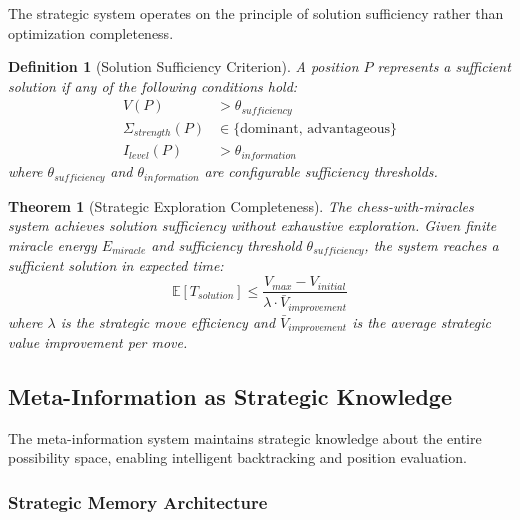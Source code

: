 \documentclass[12pt,a4paper]{article}
\newtheorem{theorem}{Theorem}
\newtheorem{definition}{Definition}
\begin{document}
The strategic system operates on the principle of solution sufficiency rather than optimization completeness.

\begin{definition}[Solution Sufficiency Criterion]
A position $P$ represents a sufficient solution if any of the following conditions hold:
\begin{align}
V(P) &> \theta_{sufficiency} \\
\Sigma_{strength}(P) &\in \{\text{dominant, advantageous}\} \\
I_{level}(P) &> \theta_{information}
\end{align}
where $\theta_{sufficiency}$ and $\theta_{information}$ are configurable sufficiency thresholds.
\end{definition}

\begin{theorem}[Strategic Exploration Completeness]
The chess-with-miracles system achieves solution sufficiency without exhaustive exploration. Given finite miracle energy $E_{miracle}$ and sufficiency threshold $\theta_{sufficiency}$, the system reaches a sufficient solution in expected time:
$$\mathbb{E}[T_{solution}] \leq \frac{V_{max} - V_{initial}}{\lambda \cdot \bar{V}_{improvement}}$$
where $\lambda$ is the strategic move efficiency and $\bar{V}_{improvement}$ is the average strategic value improvement per move.
\end{theorem}

\subsection{Meta-Information as Strategic Knowledge}

The meta-information system maintains strategic knowledge about the entire possibility space, enabling intelligent backtracking and position evaluation.

\subsubsection{Strategic Memory Architecture}
\end{document}
